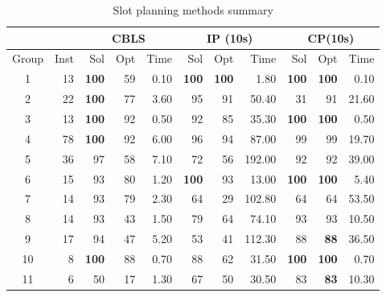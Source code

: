 \documentclass[preprint,12pt,authoryear]{elsarticle}
\begin{document}
\begin{table}[h]
    \caption{Slot planning methods summary}
    \label{tab:slot_planning_cmp}
    \footnotesize
    \centering
    \begin{tabular}{cr|rrr|rrr|rrr}
        \multicolumn{2}{c}{}  & \multicolumn{3}{c}{CBLS}             & \multicolumn{3}{c}{IP (10s)}         & \multicolumn{3}{c}{CP(10s)}           \\\hline
        Group & Inst & Sol           & Opt          & Time  & Sol          & Opt          & Time   & Sol           & Opt           & Time  \\\hline
        1     & 13   & \textbf{100}  & 59           & 0.10  & \textbf{100} & \textbf{100} & 1.80   & \textbf{100}  & \textbf{100}  & 0.10  \\
        2     & 22   & \textbf{100}  & 77           & 3.60  & 95           & 91           & 50.40  & 31            & 91            & 21.60 \\
        3     & 13   & \textbf{100}  & 92           & 0.50  & 92           & 85           & 35.30  & \textbf{100}  & \textbf{100}  & 0.50  \\
        4     & 78   & \textbf{100}  & 92           & 6.00  & 96           & 94           & 87.00  & 99            & 99            & 19.70 \\
        5     & 36   & 97            & 58           & 7.10  & 72           & 56           & 192.00 & 92            & 92            & 39.00 \\
        6     & 15   & 93            & 80           & 1.20  & \textbf{100} & 93           & 13.00  & \textbf{100}  & \textbf{100}  & 5.40  \\
        7     & 14   & 93            & 79           & 2.30  & 64           & 29           & 102.80 & 64            & 64            & 53.50 \\
        8     & 14   & 93            & 43           & 1.50  & 79           & 64           & 74.10  & 93            & 93            & 10.50 \\
        9     & 17   & 94            & 47           & 5.20  & 53           & 41           & 112.30 & 88            & \textbf{88}   & 36.50 \\
        10    & 8    & \textbf{100}  & 88           & 0.70  & 88           & 62           & 31.50  & \textbf{100}  & \textbf{100}  & 0.70  \\
        11    & 6    & 50            & 17           & 1.30  & 67           & 50           & 30.50  & 83            & \textbf{83}   & 10.30 \\\hline

\end{tabular}
\end{table}
\end{document}
